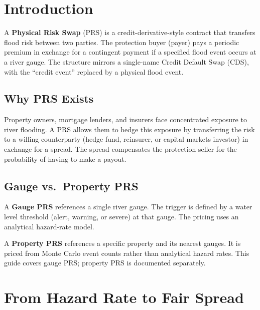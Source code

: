 \documentclass[11pt,a4paper]{article}
\begin{document}
\mkmtitlepage
\mkmlegalpage

\tableofcontents
\clearpage


\section{Introduction}

A \textbf{Physical Risk Swap} (PRS) is a credit-derivative-style contract
that transfers flood risk between two parties.  The protection buyer (payer)
pays a periodic premium in exchange for a contingent payment if a specified
flood event occurs at a river gauge.  The structure mirrors a single-name
Credit Default Swap (CDS), with the ``credit event'' replaced by a physical
flood event.

\subsection{Why PRS Exists}

Property owners, mortgage lenders, and insurers face concentrated exposure
to river flooding.  A PRS allows them to hedge this exposure by
transferring the risk to a willing counterparty (hedge fund, reinsurer, or
capital markets investor) in exchange for a spread.  The spread compensates
the protection seller for the probability of having to make a payout.

\subsection{Gauge vs.\ Property PRS}

A \textbf{Gauge PRS} references a single river gauge.  The trigger is
defined by a water level threshold (alert, warning, or severe) at that
gauge.  The pricing uses an analytical hazard-rate model.

A \textbf{Property PRS} references a specific property and its nearest
gauges.  It is priced from Monte Carlo event counts rather than
analytical hazard rates.  This guide covers gauge PRS; property PRS is
documented separately.


\section{From Hazard Rate to Fair Spread}
\end{document}
